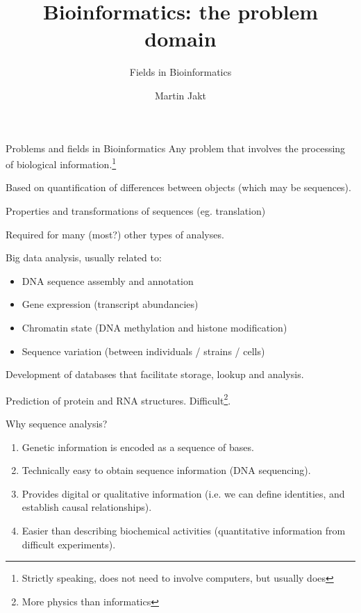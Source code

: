 \documentclass[pdf]{beamer}
\title{Bioinformatics: the problem domain}
\subtitle{Fields in Bioinformatics}
\author{Martin Jakt}
\begin{document}
\begin{frame}
  \titlepage
\end{frame}

\begin{frame}{Problems and fields in Bioinformatics}
  \small
  Any problem that involves the processing of biological information.\footnote
  {Strictly speaking, does not need to involve computers, but usually does}

  \begin{description}
    \item<2->[Phylogeny] Based on quantification of differences between objects (which
      may be sequences).
    \item<3->[Sequence analysis] Properties and transformations of sequences (eg. translation)
    \item<4->[Sequence alignment] Required for many (most?) other types of analyses.
    \item<5->[Omics] Big data analysis, usually related to:
      \begin{itemize}
        \item<5-> DNA sequence assembly and annotation
        \item<5-> Gene expression (transcript abundancies)
        \item<5-> Chromatin state (DNA methylation and histone modification)
        \item<5-> Sequence variation (between individuals / strains / cells)
      \end{itemize}
    \item<6->[Databases] Development of databases that facilitate storage, lookup and analysis.
    \item<7->[Structures] Prediction of protein and RNA structures.
      Difficult\footnote{More physics than informatics}.
  \end{description}

\end{frame}

\begin{frame}{Why sequence analysis?}
  \begin{enumerate}
    \item Genetic information is encoded as a sequence of bases.
    \item Technically easy to obtain sequence information (DNA sequencing).
    \item Provides digital or qualitative information (i.e. we can define
      identities, and establish causal relationships).
    \item Easier than describing biochemical activities (quantitative information
      from difficult experiments).
  \end{enumerate}
\end{frame}
\end{document}

